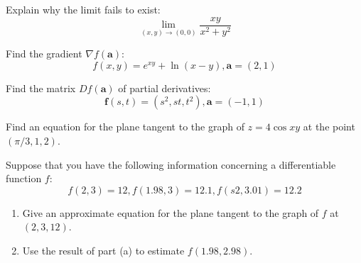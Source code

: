 \documentclass[12pt,letterpaper]{hmcpset}
\newcommand{\vb}{\mathbf}
\begin{document}

\begin{problem}[Colley 2.2.14]
  Explain why the limit fails to exist:
  \[ \lim_{(x,y) \to (0,0)} \frac{xy}{x^2 + y^2} \]
\end{problem}
\clearpage
\begin{problem}[Colley 2.3.22]
  Find the gradient $\nabla  f(\vb a)$:
  \[ f(x,y) =  e^{xy} + \ln(x-y), \vb a=(2, 1) \]
\end{problem}
\clearpage

\begin{problem}[Colley 2.3.33]
  Find the matrix $Df(\vb a)$ of partial derivatives:
  \[\vb f(s, t) = (s^2, st, t^2), \vb a = (-1, 1) \]
\end{problem}
\clearpage

\begin{problem}[Colley 2.3.38]
  Find an equation for the plane tangent to the graph of $z = 4\cos x y$ at the point $(\pi /3, 1, 2)$.
\end{problem}
\clearpage

\begin{problem}[Colley 2.3.42]
  Suppose that you have the following information concerning a differentiable function $f$:
  \[ f(2,3) = 12, f(1.98,3) = 12.1, f(s2,3.01) = 12.2\]
  \begin{enumerate}[label=(\alph*)]
  \item Give an approximate equation for the plane tangent to the graph of $f$ at $(2,3,12)$.
  \item Use the result of part (a) to estimate $f(1.98, 2.98)$.
  \end{enumerate}
\end{problem}
\clearpage
\end{document}
